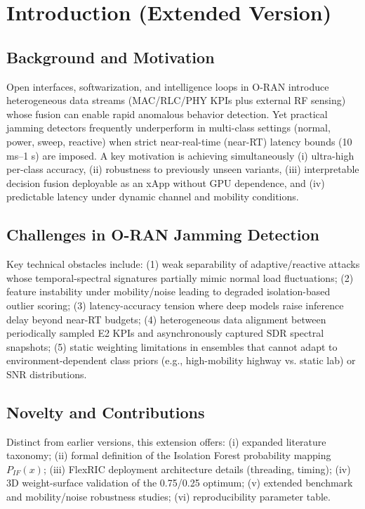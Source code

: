 
\section{Introduction (Extended Version)}
\subsection{Background and Motivation}
Open interfaces, softwarization, and intelligence loops in O-RAN introduce heterogeneous data streams (MAC/RLC/PHY KPIs plus external RF sensing) whose fusion can enable rapid anomalous behavior detection. Yet practical jamming detectors frequently underperform in multi-class settings (normal, power, sweep, reactive) when strict near-real-time (near-RT) latency bounds (10 ms--1 s) are imposed. A key motivation is achieving simultaneously (i) ultra-high per-class accuracy, (ii) robustness to previously unseen variants, (iii) interpretable decision fusion deployable as an xApp without GPU dependence, and (iv) predictable latency under dynamic channel and mobility conditions.

\subsection{Challenges in O-RAN Jamming Detection}
Key technical obstacles include: (1) weak separability of adaptive/reactive attacks whose temporal-spectral signatures partially mimic normal load fluctuations; (2) feature instability under mobility/noise leading to degraded isolation-based outlier scoring; (3) latency-accuracy tension where deep models raise inference delay beyond near-RT budgets; (4) heterogeneous data alignment between periodically sampled E2 KPIs and asynchronously captured SDR spectral snapshots; (5) static weighting limitations in ensembles that cannot adapt to environment-dependent class priors (e.g., high-mobility highway vs. static lab) or SNR distributions.

\subsection{Novelty and Contributions}
Distinct from earlier versions, this extension offers: (i) expanded literature taxonomy; (ii) formal definition of the Isolation Forest probability mapping \(P_{IF}(x)\); (iii) FlexRIC deployment architecture details (threading, timing); (iv) 3D weight-surface validation of the 0.75/0.25 optimum; (v) extended benchmark and mobility/noise robustness studies; (vi) reproducibility parameter table.

